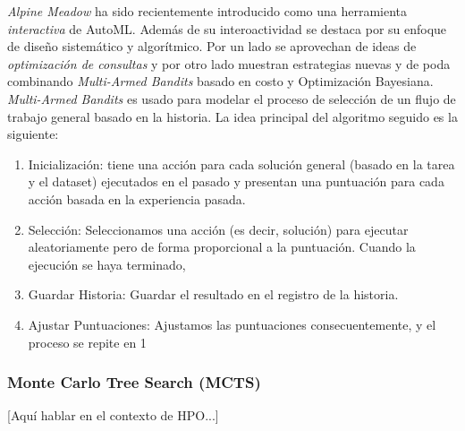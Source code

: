 \textit{Alpine Meadow} \cite{shang2019democratizing} ha sido recientemente introducido como una herramienta \emph{interactiva} de AutoML. Además de su interoactividad se destaca por su enfoque de diseño sistemático y algorítmico. Por un lado se aprovechan de ideas de \textit{optimización de consultas} y por otro lado muestran estrategias nuevas y de poda combinando \textit{Multi-Armed Bandits} basado en costo y Optimización Bayesiana. \textit{Multi-Armed Bandits} es usado para modelar el proceso de selección de un flujo de trabajo general basado en la historia. La idea principal del algoritmo seguido es la siguiente:
\begin{enumerate}
	\item Inicialización: tiene una acción para cada solución general (basado en la tarea y el dataset) ejecutados en el pasado y presentan una puntuación para cada acción basada en la experiencia pasada.
	\item Selección: Seleccionamos una acción (es decir, solución) para ejecutar aleatoriamente pero de forma proporcional a la puntuación. Cuando la ejecución se haya terminado,
	\item Guardar Historia: Guardar el resultado en el registro de la historia.
	\item Ajustar Puntuaciones: Ajustamos las puntuaciones consecuentemente, y el proceso se repite en 1
\end{enumerate}


\subsubsection{Monte Carlo Tree Search (MCTS)}

[Aquí hablar en el contexto de HPO...]

